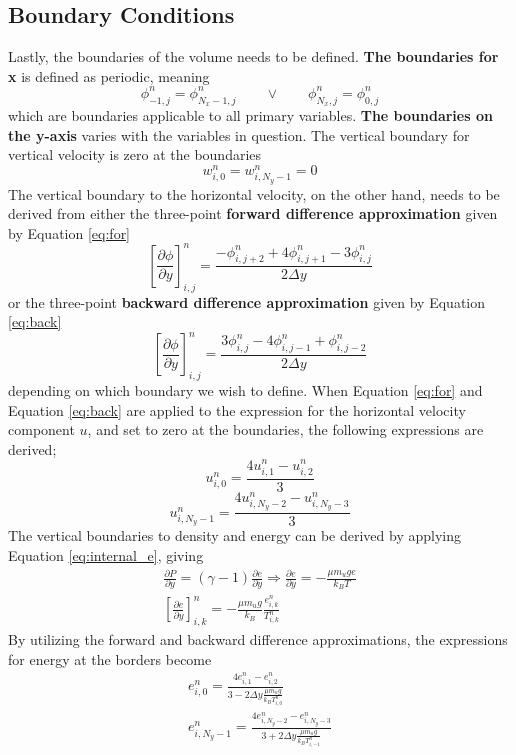\documentclass[10pt, nofootinbib, twocolumn]{revtex4-1}
\begin{document}
\subsection{Boundary Conditions}
Lastly, the boundaries of the volume needs to be defined. \textbf{The boundaries for x} is defined as periodic, meaning
$$\phi_{-1,j}^n=\phi_{N_x-1,j}^n \qquad \vee \qquad \phi_{N_x,j}^n=\phi_{0,j}^n$$
which are boundaries applicable to all primary variables. \textbf{The boundaries on the y-axis} varies with the variables in question. The vertical boundary for vertical velocity is zero at the boundaries
$$w^{n}_{i,0}=w^{n}_{i,N_y-1}=0$$
The vertical boundary to the horizontal velocity, on the other hand, needs to be derived from either the three-point \textbf{forward difference approximation} \cite{text} given by Equation \eqref{eq:for}
\begin{equation}\label{eq:for}
    \left[\frac{\partial \phi}{\partial y}\right]^{n}_{i,j} = \frac{-\phi_{i,j+2}^n+4\phi_{i,j+1}^n-3\phi_{i,j}^n}{2\Delta y}
\end{equation}
or the three-point \textbf{backward difference approximation} \cite{text} given by Equation \eqref{eq:back}
\begin{equation}\label{eq:back}
    \left[\frac{\partial \phi}{\partial y}\right]^{n}_{i,j} = \frac{3\phi_{i,j}^n-4\phi_{i,j-1}^n+\phi_{i,j-2}^n}{2\Delta y}
\end{equation}
depending on which boundary we wish to define. When Equation \eqref{eq:for} and Equation \eqref{eq:back} are applied to the expression for the horizontal velocity component $u$, and set to zero at the boundaries, the following expressions are derived; 
$$u_{i,0}^n = \frac{4u_{i,1}^n-u_{i,2}^n}{3}$$
$$u_{i,N_y-1}^n = \frac{4u_{i,N_y-2}^n-u_{i,N_y-3}^n}{3}$$ 
The vertical boundaries to density and energy can be derived by applying Equation \eqref{eq:internal_e}, giving
\begin{equation}
\begin{split}
  \frac{\partial P}{\partial y}=(\gamma -1)\frac{\partial e}{\partial y} \Rightarrow \frac{\partial e}{\partial y} = -\frac{\mu m_u ge}{k_BT}   \\
  \left[ \frac{\partial e}{\partial y}\right]_{i,k}^n = -\frac{\mu m_u g}{k_B}\frac{e_{i,k}^n}{T_{i,k}^n}
\end{split} 
\end{equation}
By utilizing the forward and backward difference approximations, the expressions for energy at the borders become 
\begin{equation}\label{eq:eis}
    \begin{split}
        e_{i,0}^n = \frac{4e_{i,1}^n-e_{i,2}^n}{3-2\Delta y\frac{\mu m_u g}{k_BT_{i,0}^n}}\\
        e_{i,N_y-1}^n = \frac{4e_{i,N_y-2}^n-e_{i,N_y-3}^n}{3+2\Delta y\frac{\mu m_u g}{k_BT_{i,-1}^n}}
    \end{split}
\end{equation}
\end{document}
